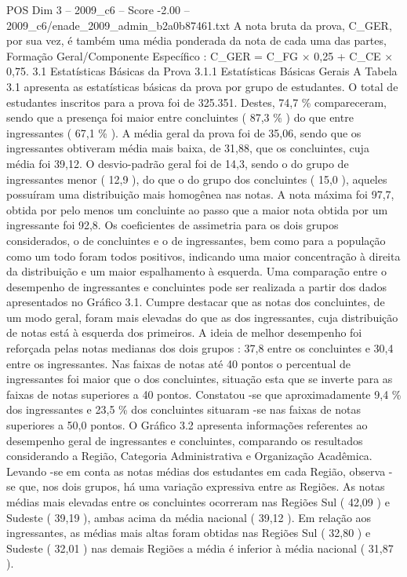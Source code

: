 \begin{textsample}{POS Dim 3 – 2009\_c6 – Score -2.00 – 2009\_c6/enade\_2009\_admin\_b2a0b87461.txt}
A nota bruta da prova, C\_GER, por sua vez, é também uma média ponderada da nota de cada uma das partes, Formação Geral/Componente Específico : C\_GER = C\_FG × 0,25 + C\_CE × 0,75. 3.1 Estatísticas Básicas da Prova 3.1.1 Estatísticas Básicas Gerais A Tabela 3.1 apresenta as estatísticas básicas da prova por grupo de estudantes.
O total de estudantes inscritos para a prova foi de 325.351.
Destes, 74,7 \% compareceram, sendo que a presença foi maior entre concluintes ( 87,3 \% ) do que entre ingressantes ( 67,1 \% ).
A média geral da prova foi de 35,06, sendo que os ingressantes obtiveram média mais baixa, de 31,88, que os concluintes, cuja média foi 39,12.
O desvio-padrão geral foi de 14,3, sendo o do grupo de ingressantes menor ( 12,9 ), do que o do grupo dos concluintes ( 15,0 ), aqueles possuíram uma distribuição mais homogênea nas notas.
A nota máxima foi 97,7, obtida por pelo menos um concluinte ao passo que a maior nota obtida por um ingressante foi 92,8.
Os coeficientes de assimetria para os dois grupos considerados, o de concluintes e o de ingressantes, bem como para a população como um todo foram todos positivos, indicando uma maior concentração à direita da distribuição e um maior espalhamento à esquerda.
Uma comparação entre o desempenho de ingressantes e concluintes pode ser realizada a partir dos dados apresentados no Gráfico 3.1.
Cumpre destacar que as notas dos concluintes, de um modo geral, foram mais elevadas do que as dos ingressantes, cuja distribuição de notas está à esquerda dos primeiros.
A ideia de melhor desempenho foi reforçada pelas notas medianas dos dois grupos : 37,8 entre os concluintes e 30,4 entre os ingressantes.
Nas faixas de notas até 40 pontos o percentual de ingressantes foi maior que o dos concluintes, situação esta que se inverte para as faixas de notas superiores a 40 pontos.
Constatou -se que aproximadamente 9,4 \% dos ingressantes e 23,5 \% dos concluintes situaram -se nas faixas de notas superiores a 50,0 pontos.
O Gráfico 3.2 apresenta informações referentes ao desempenho geral de ingressantes e concluintes, comparando os resultados considerando a Região, Categoria Administrativa e Organização Acadêmica.
Levando -se em conta as notas médias dos estudantes em cada Região, observa -se que, nos dois grupos, há uma variação expressiva entre as Regiões.
As notas médias mais elevadas entre os concluintes ocorreram nas Regiões Sul ( 42,09 ) e Sudeste ( 39,19 ), ambas acima da média nacional ( 39,12 ).
Em relação aos ingressantes, as médias mais altas foram obtidas nas Regiões Sul ( 32,80 ) e Sudeste ( 32,01 ) nas demais Regiões a média é inferior à média nacional ( 31,87 ).

\end{textsample}
